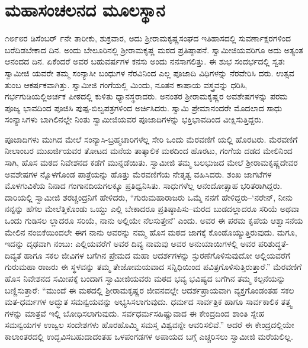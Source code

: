 
\chapter{ಮಹಾಸಂಚಲನದ ಮೂಲಸ್ಥಾನ}

\noindent

೧೮೯೮ರ ಡಿಸೆಂಬರ್ ೯ನೇ ತಾರೀಕು, ಶುಕ್ರವಾರ, ಅದು ಶ್ರೀರಾಮಕೃಷ್ಣಸಂಘದ ಇತಿಹಾಸದಲ್ಲಿ ಸುವರ್ಣಾಕ್ಷರಗಳಿಂದ ಬರೆದಿಡಬೇಕಾದ ದಿನ. ಅಂದು ಬೇಲೂರಿನಲ್ಲಿ ಶ್ರೀರಾಮಕೃಷ್ಣ ಮಠದ ಪ್ರತಿಷ್ಠಾಪನೆ. ಸ್ವಾಮೀಜಿಯವರಿಗೂ ಅದು ಅತ್ಯಂತ ಆನಂದದ ದಿನ. ಏಕೆಂದರೆ ಅವರ ಬಹುವರ್ಷಗಳ ಕನಸು ಅಂದು ನನಸಾಗಲಿತ್ತು. ಈ ಶುಭ ಸಂದರ್ಭದಲ್ಲಿ ಸ್ವತಃ ಸ್ವಾಮೀಜಿ ಯವರೇ ತಮ್ಮ ಸಂನ್ಯಾಸೀ ಬಂಧುಗಳ ನೆರವಿನಿಂದ ಎಲ್ಲ ಪೂಜಾದಿ ವಿಧಿಗಳನ್ನು ನೆರವೇರಿಸಿ ದರು. ಉತ್ಸವ ತುಂಬ ಆಕರ್ಷಕವಾಗಿತ್ತು. ಸ್ವಾಮೀಜಿ ಗಂಗೆಯಲ್ಲಿ ಮಿಂದು, ನೂತನ ಕಾಷಾಯ ವಸ್ತ್ರವನ್ನು ಧರಿಸಿ, ಗರ್ಭಗುಡಿಯಲ್ಲಿಅರ್ಚಕ ಪೀಠದಲ್ಲಿ ಕುಳಿತು ಧ್ಯಾನಸ್ಥರಾದರು. ಅನಂತರ ಶ್ರೀರಾಮಕೃಷ್ಣರ ಅವಶೇಷಗಳನ್ನು ಪರಮ ಪೂಜ್ಯ ಭಾವದಿಂದ ಪೂಜಿಸಿ ಪುಷ್ಪ-ಬಿಲ್ವಪತ್ರಗಳಿಂದ ಅರ್ಚಿಸಿದರು. ಸ್ವಾಮಿ ಪ್ರೇಮಾನಂದರೇ ಮೊದಲಾದ ಸಾಧು ಸಂನ್ಯಾಸಿಗಳು ಬಾಗಿಲಿನಲ್ಲೇ ನಿಂತು ಸ್ವಾಮೀಜಿಯವರ ಪೂಜಾದಿಗಳನ್ನು ಭಕ್ತಿಭಾವದಿಂದ ವೀಕ್ಷಿಸುತ್ತಿದ್ದರು.

ಪೂಜಾದಿಗಳು ಮುಗಿದ ಮೇಲೆ ಸಂನ್ಯಾಸಿ-ಬ್ರಹ್ಮಚಾರಿಗಳೆಲ್ಲ ಸೇರಿ ಒಂದು ಮೆರವಣಿಗೆ ಯಲ್ಲಿ ಹೊರಟರು. ಮೆರವಣಿಗೆ ನೀಲಾಂಬರ ಮುಖರ್ಜಿಯವರ ತೋಟದ ಮನೆಯ ತಾತ್ಕಾಲಿಕ ಮಠದಿಂದ ಹೊರಟು, ಗಂಗೆಯ ದಡದ ಮೇಲಿನಿಂದ ಸಾಗಿ, ಹೊಸ ಮಠದ ನಿವೇಶನದ ಕಡೆಗೆ ಮುನ್ನಡೆಯಿತು. ಸ್ವಾಮೀಜಿ ತಮ್ಮ ಬಲಭುಜದ ಮೇಲೆ ಶ್ರೀರಾಮಕೃಷ್ಣದೇವರ ಅವಶೇಷಗಳ ನ್ನೊಳಗೊಂಡ ಪಾತ್ರೆಯನ್ನು ಹೊತ್ತು ಮೆರವಣಿಗೆಯ ನೇತೃತ್ವ ವಹಿಸಿದರು. ಶಂಖ ಜಾಗಟೆಗಳ ಮೊಳಗುವಿಕೆಯ ನಿನಾದ ಗಂಗಾನದಿಯಗಲಕ್ಕೂ ಪ್ರತಿಧ್ವನಿಸಿತು. ಸಾಧುಗಳೆಲ್ಲ ಆನಂದೋತ್ಸಾಹ ಭರಿತರಾಗಿದ್ದರು. ದಾರಿಯಲ್ಲಿ ಸ್ವಾಮೀಜಿ ಶರಚ್ಚಂದ್ರನಿಗೆ ಹೇಳಿದರು, “ಗುರುಮಹಾರಾಜರು ಒಮ್ಮೆ ನನಗೆ ಹೇಳಿದ್ದರು–‘ನರೇನ್, ನೀನು ನನ್ನನ್ನು ಹೆಗಲ ಮೇಲೆತ್ತಿಕೊಂಡು ಒಯ್ದು ಎಲ್ಲಿ ಬೇಕಾದರೂ ಪ್ರತಿಷ್ಠಾಪಿಸು–ಮರದ ಬುಡದಲ್ಲಾದರೂ ಸರಿಯೆ ಅಥವಾ ಒಂದು ಗುಡಿಸಲ ಲ್ಲಾದರೂ ಸರಿಯೆ, ನಾನು ಅಲ್ಲಿಯೇ ನೆಲಸುತ್ತೇನೆ’ ಎಂದು. ಅವರ ಈ ಪರಮ ಕೃಪೆಯ ಆಶ್ವಾಸನೆಯ ಮೇಲಿನ ನಂಬಿಕೆಯಿಂದಲೇ ಈಗ ನಾನು ಅವರನ್ನು ನಮ್ಮ ಹೊಸ ಮಠದ ಜಾಗಕ್ಕೆ ಕೊಂಡೊಯ್ಯುತ್ತಿರುವುದು. ಮಗೂ, ಇದನ್ನು ದೃಢವಾಗಿ ನಂಬು: ಎಲ್ಲಿಯವರೆಗೆ ಅವರ ದಿವ್ಯ ನಾಮವು ಅವರ ಅನುಯಾಯಿಗಳಲ್ಲಿ ಅವರ ಪರಿಶುದ್ಧತೆ-ದಿವ್ಯತೆ ಹಾಗೂ ಸಕಲ ಜೀವಿಗಳ ಬಗೆಗಿನ ಪ್ರೇಮದ ಮಹಾ ಆದರ್ಶಗಳನ್ನು ಸ್ಫುರಣೆಗೊಳಿಸುವುದೋ ಅಲ್ಲಿಯವರೆಗೆ ಗುರುಮಹಾ ರಾಜರು ಈ ಸ್ಥಳವನ್ನು ತಮ್ಮ ತೇಜೋಮಯವಾದ ಸನ್ನಿಧಿಯಿಂದ ಪವಿತ್ರಗೊಳಿಸುತ್ತಿರುತ್ತಾರೆ.” ಮೆರವಣಿಗೆ ಹೊಸ ನಿವೇಶನದ ಸಮೀಪಕ್ಕೆ ಬಂದಾಗ ಸ್ವಾಮೀಜಿಯವರು ಮಠದ ಭವ್ಯ ಭವಿಷ್ಯದ ಬಗೆಗಿನ ತಮ್ಮ ಕಲ್ಪನೆಯನ್ನು ಬಣ್ಣಿಸುತ್ತಾರೆ: “ಮುಂದೆ ಈ ಮಠದಲ್ಲಿ ಶ್ರೀರಾಮಕೃಷ್ಣರ ಜೀವನದಲ್ಲೇ ಆದರ್ಶಪ್ರಾಯವಾಗಿ ವ್ಯಕ್ತಗೊಂಡಂತಹ ಸಕಲ ಮತ-ಧರ್ಮಗಳ ಅದ್ಭುತ ಸಮನ್ವಯವನ್ನು ಅಭ್ಯಸಿಸಲಾಗುವುದು. ಧರ್ಮದ ಸಾರ್ವತ್ರಿಕ ಹಾಗೂ ಸಾರ್ವಕಾಲಿಕ ತತ್ತ್ವ ಗಳನ್ನು ಮಾತ್ರವೆ ಇಲ್ಲಿ ಬೋಧಿಸಲಾಗುವುದು. ಸರ್ವಧರ್ಮಸಹಿಷ್ಣುವಾದ ಈ ಕೇಂದ್ರದಿಂದ ಶಾಂತಿ ಸ್ನೇಹ ಸಮನ್ವಯಗಳ ಉಜ್ವಲ ಸಂದೇಶಗಳು ಹೊರಹೊಮ್ಮಿ ಸಮಸ್ತ ವಿಶ್ವವನ್ನೇ ಆವರಿಸಲಿವೆ.” ಆದರೆ ಈ ಕೇಂದ್ರದಲ್ಲಿಯೇ ಕಾಲಾಂತರದಲ್ಲಿ ಉದ್ಭವಿಸಬಹುದಾದಂತಹ ಒಳಪಂಗಡಗಳ ಅಪಾಯದ ಬಗ್ಗೆ ಎಚ್ಚರಿಸಲು ಸ್ವಾಮೀಜಿ ಮರೆಯಲಿಲ್ಲ.

